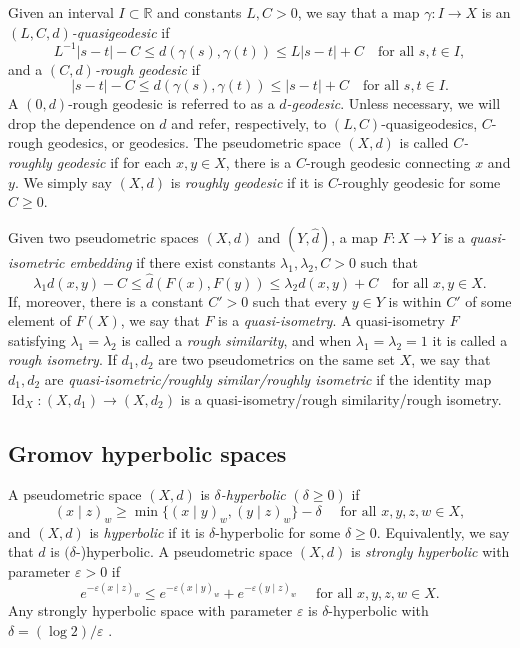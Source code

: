 \documentclass[twoside]{amsart}
\theoremstyle{definition}
\numberwithin{equation}{section}
\numberwithin{theorem}{section}
\newcommand{\del}{\delta}
\newcommand{\ep}{\epsilon}
\renewcommand{\epsilon}{\varepsilon}
\DeclareMathOperator{\Id}{Id}
\newcommand{\gpr}[2]{(#1 \mid#2)}
\newcommand{\ra}{\rightarrow}
\begin{document}
Given an interval $I \subset \mathbb{R}$ and constants $L,C>0$, we
say that a map $\gamma \colon I \to X$ is an \emph{$(L,C,d)$-quasigeodesic}
if
\begin{equation*}
L^{-1}|s-t|-C \leq d(\gamma(s),\gamma(t)) \leq L |s-t| + C
\quad \text{for all } s,t \in I,
\label{eq:qi}
\end{equation*}
and a \emph{$(C,d)$-rough geodesic} if
\[
|s-t| - C \leq d(\gamma(s), \gamma(t)) \leq |s-t| + C
\quad \text{for all } s,t \in I .
\]
A $(0,d)$-rough geodesic is referred to as a \emph{$d$-geodesic}. Unless necessary, we will drop the dependence on $d$ and refer, respectively, to $(L,C)$-quasigeodesics,
$C$-rough geodesics, or geodesics.
The pseudometric space $(X,d)$ is called \emph{$C$-roughly geodesic} if for
each $x, y \in X$, there is a $C$-rough geodesic connecting $x$ and $y$.
We simply say $(X,d)$ is \emph{roughly geodesic} if it is $C$-roughly geodesic
for some $C\geq 0$.

Given two pseudometric spaces $(X,d)$ and $(Y,\hat d)$,
a map $F \colon X \to Y$ is a \emph{quasi-isometric embedding} if there exist
constants $\lambda_1,\lambda_2,C>0$ such that
\[
\lambda_1 d(x,y) - C \leq \hat d(F(x),F(y)) \leq \lambda_2 d(x,y) + C
\quad \text{for all } x,y \in X .
\]
If, moreover, there is a constant $C'>0$ such that every $y \in Y$ is
within $C'$ of some element of $F(X)$, we say that $F$ is a \emph{quasi-isometry}.
A quasi-isometry $F$ satisfying $\lambda_1=\lambda_2$ is called a
\emph{rough similarity}, and when $\lambda_1=\lambda_2=1$ it is called
a \emph{rough isometry}. If $d_1,d_2$ are two pseudometrics on the same set $X$, we say that $d_1,d_2$ are \emph{quasi-isometric/roughly similar/roughly isometric} if the identity map $\Id_X:(X,d_1)\ra (X,d_2)$ is a quasi-isometry/rough similarity/rough isometry.


\subsection{Gromov hyperbolic spaces}\label{subsec:hyperbolic}


A pseudometric space $(X,d)$ is $\delta$\emph{-hyperbolic} $(\del\geq 0)$ if
\begin{equation}\label{eq:gromovhyp}
\gpr{x}{z}_{w} \geq \min \{ \gpr{x}{y}_w, \gpr{y}{z}_w \} - \delta
 \quad \text{ for all }x,y,z,w \in X,\end{equation}
and $(X,d)$ is \emph{hyperbolic} if it is $\delta$-hyperbolic for some $\delta \geq 0$. Equivalently, we say that $d$ is $(\del$-)hyperbolic. A pseudometric space $(X,d)$ is \emph{strongly hyperbolic} with parameter $\ep>0$ if 
\begin{equation}\label{eq:defstronghyp}
    e^{-\ep\gpr{x}{z}_w}\leq e^{-\ep\gpr{x}{y}_w}+e^{-\ep\gpr{y}{z}_w} \quad \text{ for all }x,y,z,w\in X.
\end{equation}
Any strongly hyperbolic space with parameter $\ep$ is $\del$-hyperbolic with $\del=(\log 2)/\ep$ \cite[Theorem~4.2]{nica-spakula}.
\end{document}
